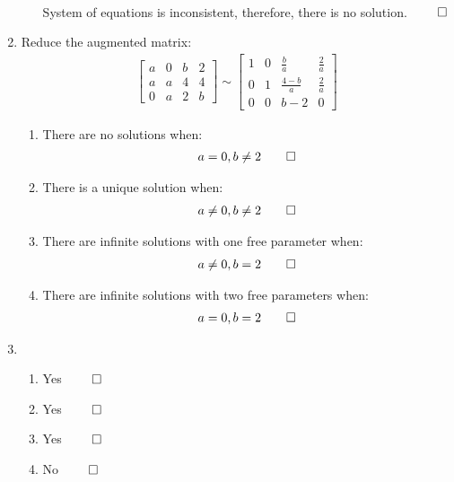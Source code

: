 \documentclass[12pt, a4paper]{article}
\begin{document}
\begin{enumerate}[Q\arabic*.]
\begin{enumerate}[(\alph*)]
\begin{align*}
    \end{align*}
    System of equations is inconsistent, therefore, there is no solution. $\qed$
  \end{enumerate}
  \item Reduce the augmented matrix:
    \begin{align*}
      \begin{bmatrix}
        a & 0 & b & 2 \\
        a & a & 4 & 4 \\
        0 & a & 2 & b
      \end{bmatrix}
      \sim
      \begin{bmatrix}
        1 & 0 & \frac{b}{a} & \frac{2}{a} \\
        0 & 1 & \frac{4-b}{a} & \frac{2}{a} \\
        0 & 0 & b-2 & 0
      \end{bmatrix}
    \end{align*}
    \begin{enumerate}[(\alph*)]
      \item There are no solutions when:
        \begin{align*}
        a = 0, b \neq 2 \qed
        \end{align*}
      \item There is a unique solution when:
        \begin{align*}
          a \neq 0, b \neq 2 \qed
        \end{align*}
      \item There are infinite solutions with one free parameter when:
        \begin{align*}
          a \neq 0, b = 2 \qed
        \end{align*}
      \item There are infinite solutions with two free parameters when:
        \begin{align*}
          a = 0, b = 2 \qed
        \end{align*}
    \end{enumerate}
  \item 
    \begin{enumerate}[(\alph*)]
      \item Yes $\qed$
      \item Yes $\qed$
      \item Yes $\qed$
      \item No $\qed$
    \end{enumerate}


\end{enumerate}
\end{document}
